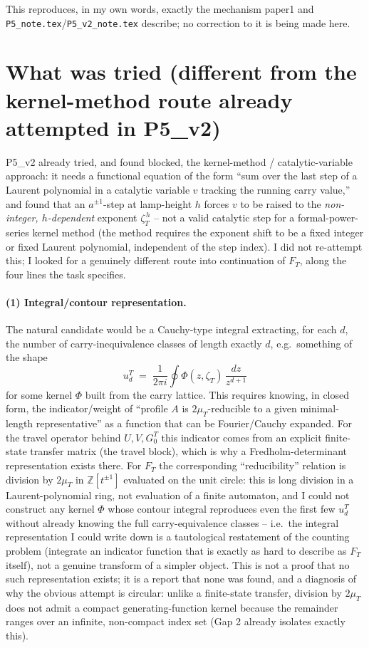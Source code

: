 \documentclass[11pt]{article}
\begin{document}
This reproduces, in my own words, exactly the mechanism paper1 and
\texttt{P5\_note.tex}/\texttt{P5\_v2\_note.tex} describe; no correction to it
is being made here.

\section*{What was tried (different from the kernel-method route already
attempted in P5\_v2)}

P5\_v2 already tried, and found blocked, the kernel-method / catalytic-variable
approach: it needs a functional equation of the form ``sum over the last step
of a Laurent polynomial in a catalytic variable $v$ tracking the running
carry value,'' and found that an $a^{\pm1}$-step at lamp-height $h$ forces $v$
to be raised to the \emph{non-integer, $h$-dependent} exponent $\zeta_T^{\,h}$
-- not a valid catalytic step for a formal-power-series kernel method (the
method requires the exponent shift to be a fixed integer or fixed Laurent
polynomial, independent of the step index). I did not re-attempt this; I
looked for a genuinely different route into continuation of $F_T$, along the
four lines the task specifies.

\paragraph{(1) Integral/contour representation.} The natural candidate would
be a Cauchy-type integral extracting, for each $d$, the number of
carry-inequivalence classes of length exactly $d$, e.g.\ something of the
shape
\[
u_d^T \;=\; \frac{1}{2\pi i}\oint \Phi(z,\zeta_T)\,\frac{dz}{z^{d+1}}
\]
for some kernel $\Phi$ built from the carry lattice. This requires knowing, in
closed form, the indicator/weight of ``profile $A$ is $2\mu_T$-reducible to a
given minimal-length representative'' as a function that can be Fourier/Cauchy
expanded. For the travel operator behind $U,V,G^T_0$ this indicator comes from
an explicit finite-state transfer matrix (the travel block), which is why a
Fredholm-determinant representation exists there. For $F_T$ the corresponding
``reducibility'' relation is division by $2\mu_T$ in $\mathbb Z[t^{\pm1}]$
evaluated on the unit circle: this is long division in a Laurent-polynomial
ring, not evaluation of a finite automaton, and I could not construct any
kernel $\Phi$ whose contour integral reproduces even the first few $u_d^T$
without already knowing the full carry-equivalence classes -- i.e.\ the
integral representation I could write down is a tautological restatement of
the counting problem (integrate an indicator function that is exactly as hard
to describe as $F_T$ itself), not a genuine transform of a simpler object.
This is not a proof that no such representation exists; it is a report that
none was found, and a diagnosis of why the obvious attempt is circular: unlike
a finite-state transfer, division by $2\mu_T$ does not admit a compact
generating-function kernel because the remainder ranges over an infinite,
non-compact index set (Gap 2 already isolates exactly this).
\end{document}
